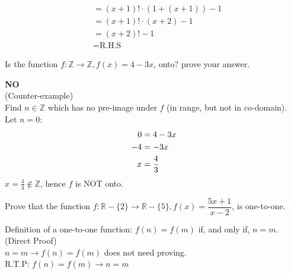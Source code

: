 \documentclass[answers]{exam}
\begin{document}
\begin{questions}
\begin{shaded}
\begin{solutionorbox}
\begin{align*}
                                                                 & = (x + 1)! \cdot (1 + (x+1)) - 1 \tag{Simplify}                                  \\
                                                                 & = (x + 1)! \cdot (x + 2) - 1 \tag{Simplify}                                      \\
                                                                 & = (x + 2)! - 1 \tag{Factorial Simplification}                                    \\
                                                                 & = \text{R.H.S} \tag{Proven}
            \end{align*}
        \end{solutionorbox}
    \end{shaded}
    \question Is the function $f : \mathbb{Z} \longrightarrow \mathbb{Z}, f(x) = 4 - 3x$, onto? prove your answer.
    \begin{shaded}
        \begin{solutionorbox}
            \textbf{NO}\\
            (Counter-example)\\
            Find $n \in \mathbb{Z}$ which has no pre-image under $f$ (in range, but not in co-domain).\\
            Let $n = 0$:
            \begin{align}
                0    & = 4 - 3x \notag      \\
                -4   & = -3x \notag         \\
                x    & = \frac{4}{3} \notag
            \end{align}
            $x = \frac{4}{3} \notin \mathbb{Z}$, hence $f$ is NOT onto.
        \end{solutionorbox}
    \end{shaded}
    \question Prove that the function $f : \mathbb{R} - \{ 2 \} \longrightarrow \mathbb{R} - \{ 5 \}, f(x) = \dfrac{5x + 1}{x - 2}$, is one-to-one.
    \begin{shaded}
        \begin{solutionorbox}
            Definition of a one-to-one function: $f(n) = f(m)$ if, and only if, $n = m$.\\
            (Direct Proof)\\
            $n = m \rightarrow f(n) = f(m)$ does not need proving.\\
            R.T.P: $f(n) = f(m) \rightarrow n = m$
            \begin{align*}

\end{align*}
\end{solutionorbox}
\end{shaded}
\end{questions}
\end{document}
